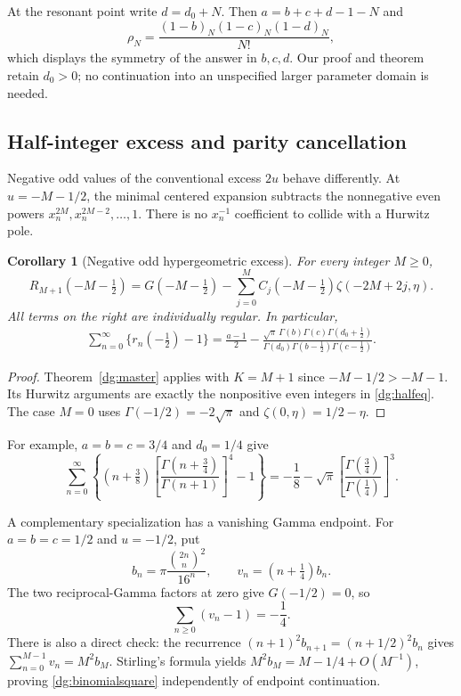 \documentclass[11pt,a4paper]{article}
\numberwithin{equation}{section}
\newtheorem{corollary}[theorem]{Corollary}
\theoremstyle{definition}
\theoremstyle{remark}
\begin{document}
At the resonant point write $d=d_0+N$. Then
$a=b+c+d-1-N$ and
\[
 \rho_N=\frac{(1-b)_N(1-c)_N(1-d)_N}{N!},
\]
which displays the symmetry of the answer in $b,c,d$. Our proof and
theorem retain $d_0>0$; no continuation into an unspecified larger
parameter domain is needed.

\subsection{Half-integer excess and parity cancellation}
Negative odd values of the conventional excess $2u$ behave differently.
At $u=-M-1/2$, the minimal centered expansion subtracts the nonnegative
even powers $x_n^{2M},x_n^{2M-2},\ldots,1$. There is no $x_n^{-1}$
coefficient to collide with a Hurwitz pole.

\begin{corollary}[Negative odd hypergeometric excess]\label{dg:half}
For every integer $M\ge0$,
\begin{equation}\label{dg:halfeq}
 R_{M+1}(-M-\tfrac12)
 =G(-M-\tfrac12)-\sum_{j=0}^{M}
       C_j(-M-\tfrac12)\zeta(-2M+2j,\eta).
\end{equation}
All terms on the right are individually regular. In particular,
\begin{align}
 \sum_{n=0}^{\infty}\{r_n(-\tfrac12)-1\}
 =\frac{a-1}{2}
 -\frac{\sqrt\pi\,\Gamma(b)\Gamma(c)\Gamma(d_0+\tfrac12)}
 {\Gamma(d_0)\Gamma(b-\tfrac12)\Gamma(c-\tfrac12)}.
 \label{dg:halfsimple}
\end{align}
\end{corollary}
\begin{proof}
Theorem~\ref{dg:master} applies with $K=M+1$ since
$-M-1/2>-M-1$. Its Hurwitz arguments are exactly the nonpositive
even integers in \eqref{dg:halfeq}. The case $M=0$ uses
$\Gamma(-1/2)=-2\sqrt\pi$ and $\zeta(0,\eta)=1/2-\eta$.
\end{proof}

For example, $a=b=c=3/4$ and $d_0=1/4$ give
\begin{equation}\label{dg:quarteridentity}
 \boxed{\sum_{n=0}^{\infty}\left\{
 (n+\tfrac38)\left[\frac{\Gamma(n+\tfrac34)}{\Gamma(n+1)}\right]^4-1
 \right\}=-\frac18-\sqrt\pi
     \left[\frac{\Gamma(\tfrac34)}{\Gamma(\tfrac14)}\right]^3.}
\end{equation}

A complementary specialization has a vanishing Gamma endpoint.
For $a=b=c=1/2$ and $u=-1/2$, put
\[
 b_n=\pi\frac{\binom{2n}{n}^2}{16^n},\qquad
 v_n=(n+\tfrac14)b_n.
\]
The two reciprocal-Gamma factors at zero give $G(-1/2)=0$, so
\begin{equation}\label{dg:binomialsquare}
 \sum_{n\ge0}(v_n-1)=-\frac14.
\end{equation}
There is also a direct check: the recurrence
$(n+1)^2b_{n+1}=(n+1/2)^2b_n$ gives
$\sum_{n=0}^{M-1}v_n=M^2b_M$. Stirling's formula yields
$M^2b_M=M-1/4+O(M^{-1})$, proving \eqref{dg:binomialsquare}
independently of endpoint continuation.
\end{document}
